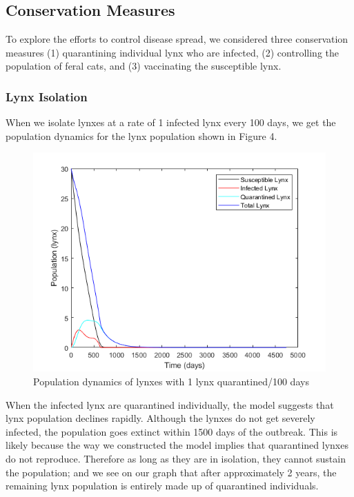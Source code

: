 \documentclass[12pt]{article}
\begin{document}
\subsection{Conservation Measures}
To explore the efforts to control disease spread, we considered three conservation measures (1) quarantining individual lynx who are infected, (2) controlling the population of feral cats, and (3) vaccinating the susceptible lynx.


\subsubsection{Lynx Isolation}
\quad When we isolate lynxes at a rate of 1 infected lynx every 100 days, we get the population dynamics for the lynx population shown in Figure 4.

\begin{figure}[!ht]
    \centering
    \includegraphics[scale=0.75]{images/isolation.png}
    \caption{Population dynamics of lynxes with 1 lynx quarantined/100 days}
    \label{fig:my_label}
\end{figure}

\quad When the infected lynx are quarantined individually, the model suggests that lynx population declines rapidly. Although the lynxes do not get severely infected, the population goes extinct within 1500 days of the outbreak. This is likely because the way we constructed the model implies that quarantined lynxes do not reproduce. Therefore as long as they are in isolation, they cannot sustain the population; and we see on our graph that after approximately 2 years, the remaining lynx population is entirely made up of quarantined individuals. 
\end{document}
